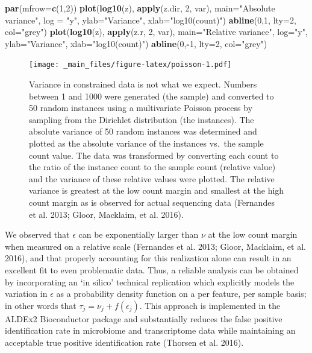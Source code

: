 \documentclass[onecolumn]{article}
\newenvironment{Shaded}{\begin{snugshade}}{\end{snugshade}}
\newcommand{\DataTypeTok}[1]{\textcolor[rgb]{0.13,0.29,0.53}{#1}}
\newcommand{\DecValTok}[1]{\textcolor[rgb]{0.00,0.00,0.81}{#1}}
\newcommand{\KeywordTok}[1]{\textcolor[rgb]{0.13,0.29,0.53}{\textbf{#1}}}
\newcommand{\NormalTok}[1]{#1}
\newcommand{\OperatorTok}[1]{\textcolor[rgb]{0.81,0.36,0.00}{\textbf{#1}}}
\newcommand{\StringTok}[1]{\textcolor[rgb]{0.31,0.60,0.02}{#1}}
\begin{document}
\begin{Shaded}
\begin{Highlighting}[]
\KeywordTok{par}\NormalTok{(}\DataTypeTok{mfrow=}\KeywordTok{c}\NormalTok{(}\DecValTok{1}\NormalTok{,}\DecValTok{2}\NormalTok{))}
\KeywordTok{plot}\NormalTok{(}\KeywordTok{log10}\NormalTok{(z), }\KeywordTok{apply}\NormalTok{(z.dir, }\DecValTok{2}\NormalTok{, var), }\DataTypeTok{main=}\StringTok{"Absolute variance"}\NormalTok{, }\DataTypeTok{log =} \StringTok{"y"}\NormalTok{,}
    \DataTypeTok{ylab=}\StringTok{"Variance"}\NormalTok{, }\DataTypeTok{xlab=}\StringTok{"log10(count)"}\NormalTok{)}
\KeywordTok{abline}\NormalTok{(}\DecValTok{0}\NormalTok{,}\DecValTok{1}\NormalTok{, }\DataTypeTok{lty=}\DecValTok{2}\NormalTok{, }\DataTypeTok{col=}\StringTok{"grey"}\NormalTok{)}
\KeywordTok{plot}\NormalTok{(}\KeywordTok{log10}\NormalTok{(z), }\KeywordTok{apply}\NormalTok{(z.r, }\DecValTok{2}\NormalTok{, var), }\DataTypeTok{main=}\StringTok{"Relative variance"}\NormalTok{, }\DataTypeTok{log=}\StringTok{"y"}\NormalTok{,}
    \DataTypeTok{ylab=}\StringTok{"Variance"}\NormalTok{, }\DataTypeTok{xlab=}\StringTok{"log10(count)"}\NormalTok{)}
\KeywordTok{abline}\NormalTok{(}\DecValTok{0}\NormalTok{,}\OperatorTok{-}\DecValTok{1}\NormalTok{, }\DataTypeTok{lty=}\DecValTok{2}\NormalTok{, }\DataTypeTok{col=}\StringTok{"grey"}\NormalTok{)}
\end{Highlighting}
\end{Shaded}

\begin{figure}
\centering
\texttt{[image: \_main\_files/figure-latex/poisson-1.pdf]}
\caption{\label{fig:poisson}Variance in constrained data is not what we expect. Numbers between 1 and 1000 were generated (the sample) and converted to 50 random instances using a multivariate Poisson process by sampling from the Dirichlet distribution (the instances). The absolute variance of 50 random instances was determined and plotted as the absolute variance of the instances vs.~the sample count value. The data was transformed by converting each count to the ratio of the instance count to the sample count (relative value) and the variance of these relative values were plotted. The relative variance is greatest at the low count margin and smallest at the high count margin as is observed for actual sequencing data (Fernandes et al. 2013; Gloor, Macklaim, et al. 2016).}
\end{figure}

We observed that \(\epsilon\) can be exponentially larger than \(\nu\) at the low count margin when measured on a relative scale (Fernandes et al. 2013; Gloor, Macklaim, et al. 2016), and that properly accounting for this realization alone can result in an excellent fit to even problematic data. Thus, a reliable analysis can be obtained by incorporating an `in silico' technical replication which explicitly models the variation in \(\epsilon\) as a probability density function on a per feature, per sample basis; in other words that \(\tau_{j} = \nu_j + f(\epsilon_{j})\). This approach is implemented in the ALDEx2 Bioconductor package and substantially reduces the false positive identification rate in microbiome and transcriptome data while maintaining an acceptable true positive identification rate (Thorsen et al. 2016).
\end{document}
